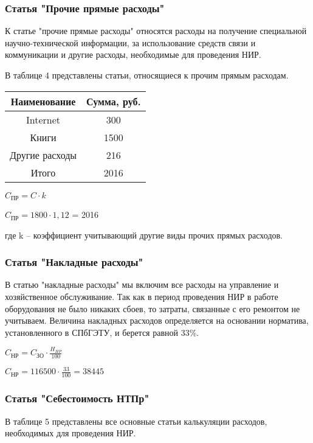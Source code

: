 \subsubsection*{Статья "Прочие прямые расходы"}

К статье "прочие прямые расходы" относятся расходы на получение специальной научно-технической информации, за использование средств связи и коммуникации и другие расходы, необходимые для проведения НИР.

В таблице 4 представлены статьи, относящиеся к прочим прямым расходам.

\begin{center}
\begin{tabular}{|c|c|}
  \hline
  Наименование & Сумма, руб. \\ \hline
  Internet & 300 \\ \hline
  Книги & 1500  \\ \hline
  Другие расходы &  216 \\ \hline
  Итого & 2016\\ \hline
\end{tabular}


$C_{\text{ПР}} = C \cdot k$

$C_{\text{ПР}} = 1800 \cdot 1,12$ = 2016

\end{center}

где k -- коэффициент учитывающий другие виды прочих прямых расходов.

\subsubsection*{Статья "Накладные расходы"}

В статью "накладные расходы" мы включим все расходы на управление и хозяйственное обслуживание. Так как в период проведения НИР в работе оборудования не было никаких сбоев, то затраты, связанные с его ремонтом не учитываем. Величина накладных расходов определяется на основании норматива, установленного в СПбГЭТУ, и берется равной 33\%.

\begin{center}
$C_{\text{НР}} = C_{\text{ЗО}} \cdot \frac{H_{HP}}{100}$

$C_{\text{НР}} = 116500 \cdot \frac{33}{100} = 38445$
\end{center}

\subsubsection*{Статья "Себестоимость НТПр"}
В таблице 5 представлены все основные статьи калькуляции расходов, необходимых для проведения НИР.

